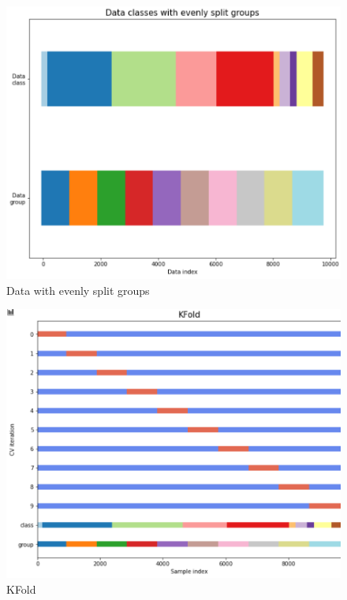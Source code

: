\documentclass[11pt]{article}
\begin{document}
\begin{figure}[h]
  \caption {Data with evenly split groups} \label{DataWWithEvenlySplitGroups}
  \centering 
  \includegraphics[width = \textwidth, height = 0.5\textwidth, keepaspectratio]{Images/DataWithEvenlySplitGroups.png}
\end{figure}


\begin{figure}[h]
  \caption {KFold} \label{KFoldVisualised}
  \centering 
  \includegraphics[width = \textwidth, height = 0.5\textwidth, keepaspectratio]{Images/KFold.png}
\end{figure}


\FloatBarrier
\end{document}
